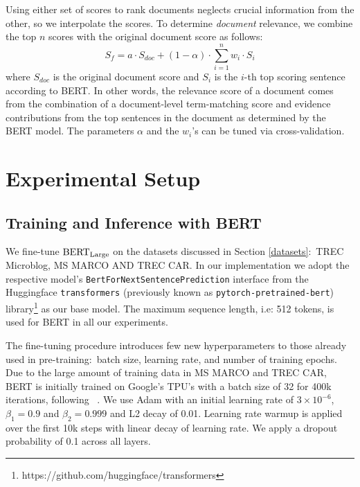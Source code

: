 Using either set of scores to rank documents neglects crucial information from the other, so we interpolate the scores.
To determine {\it document} relevance, we combine the top $ n $ scores with the original document score as follows:
\begin{equation} \label{eq:1}
S_f = a \cdot S_{doc}  + (1 - \alpha) \cdot \sum_{i = 1}^n w_i \cdot S_i
\end{equation}
\noindent where $ S_{doc} $ is the original document score and $ S_i $ is the $ i $-th top scoring sentence according to BERT.
In other words, the relevance score of a document comes from the combination of a document-level term-matching score and evidence contributions from the top sentences in the document as determined by the BERT model.
The parameters $ \alpha $ and the $ w_i $'s can be tuned via cross-validation.

\section{Experimental Setup}

\subsection{Training and Inference with BERT}

We fine-tune $ \textrm{BERT}_{\textrm{\scriptsize Large}} $ \cite{devlin2018bert} on the datasets discussed in Section \ref{datasets}:\ TREC Microblog, MS MARCO AND TREC CAR.
In our implementation we adopt the respective model's \texttt{BertForNextSentencePrediction} interface from the Huggingface \texttt{transformers} (previously known as \texttt{pytorch-pretrained-bert}) library\footnote{https://github.com/huggingface/transformers} as our base model.
The maximum sequence length, i.e: 512 tokens, is used for BERT in all our experiments.

The fine-tuning procedure introduces few new hyperparameters to those already used in pre-training:\ batch size, learning rate, and number of training epochs.
Due to the large amount of training data in MS MARCO and TREC CAR, BERT is initially trained on Google's TPU's with a batch size of 32 for 400k iterations, following ~\cite{nogueira2019passage}.
We use Adam \cite{kingma2014adam} with an initial learning rate of $ 3 \times 10^{-6}$, $ \beta_1 = 0.9 $ and $ \beta_2 = 0.999 $ and L2 decay of 0.01.
Learning rate warmup is applied over the first 10k steps with linear decay of learning rate.
We apply a dropout probability of 0.1 across all layers.

